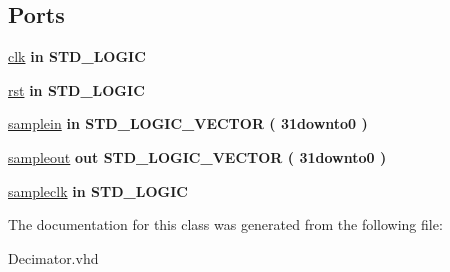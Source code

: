 \subsection*{Ports}
 \begin{DoxyCompactItemize}
\item 
\hypertarget{class_decimator_ac715205022cc6a57e13ad8f76f6f6be1}{\hyperlink{class_decimator_ac715205022cc6a57e13ad8f76f6f6be1}{clk}  {\bfseries {\bfseries \textcolor{vhdlkeyword}{in}\textcolor{vhdlchar}{ }}} {\bfseries \textcolor{comment}{S\-T\-D\-\_\-\-L\-O\-G\-I\-C}\textcolor{vhdlchar}{ }} }\label{class_decimator_ac715205022cc6a57e13ad8f76f6f6be1}

\item 
\hypertarget{class_decimator_a3d83ec9524ce3d54136f1f371f5d0528}{\hyperlink{class_decimator_a3d83ec9524ce3d54136f1f371f5d0528}{rst}  {\bfseries {\bfseries \textcolor{vhdlkeyword}{in}\textcolor{vhdlchar}{ }}} {\bfseries \textcolor{comment}{S\-T\-D\-\_\-\-L\-O\-G\-I\-C}\textcolor{vhdlchar}{ }} }\label{class_decimator_a3d83ec9524ce3d54136f1f371f5d0528}

\item 
\hypertarget{class_decimator_ae77b2981b3e1cb94b73b9306e2bfd2d5}{\hyperlink{class_decimator_ae77b2981b3e1cb94b73b9306e2bfd2d5}{samplein}  {\bfseries {\bfseries \textcolor{vhdlkeyword}{in}\textcolor{vhdlchar}{ }}} {\bfseries \textcolor{comment}{S\-T\-D\-\_\-\-L\-O\-G\-I\-C\-\_\-\-V\-E\-C\-T\-O\-R}\textcolor{vhdlchar}{ }\textcolor{vhdlchar}{(}\textcolor{vhdlchar}{ }\textcolor{vhdlchar}{31downto0}\textcolor{vhdlchar}{ }\textcolor{vhdlchar}{)}\textcolor{vhdlchar}{ }} }\label{class_decimator_ae77b2981b3e1cb94b73b9306e2bfd2d5}

\item 
\hypertarget{class_decimator_a9003af1f210f2c22f3fa88d5471600a2}{\hyperlink{class_decimator_a9003af1f210f2c22f3fa88d5471600a2}{sampleout}  {\bfseries {\bfseries \textcolor{vhdlkeyword}{out}\textcolor{vhdlchar}{ }}} {\bfseries \textcolor{comment}{S\-T\-D\-\_\-\-L\-O\-G\-I\-C\-\_\-\-V\-E\-C\-T\-O\-R}\textcolor{vhdlchar}{ }\textcolor{vhdlchar}{(}\textcolor{vhdlchar}{ }\textcolor{vhdlchar}{31downto0}\textcolor{vhdlchar}{ }\textcolor{vhdlchar}{)}\textcolor{vhdlchar}{ }} }\label{class_decimator_a9003af1f210f2c22f3fa88d5471600a2}

\item 
\hypertarget{class_decimator_a31fd30574fccc27b243b2e458afc5481}{\hyperlink{class_decimator_a31fd30574fccc27b243b2e458afc5481}{sampleclk}  {\bfseries {\bfseries \textcolor{vhdlkeyword}{in}\textcolor{vhdlchar}{ }}} {\bfseries \textcolor{comment}{S\-T\-D\-\_\-\-L\-O\-G\-I\-C}\textcolor{vhdlchar}{ }} }\label{class_decimator_a31fd30574fccc27b243b2e458afc5481}

\end{DoxyCompactItemize}


The documentation for this class was generated from the following file\-:\begin{DoxyCompactItemize}
\item 
Decimator.\-vhd\end{DoxyCompactItemize}
